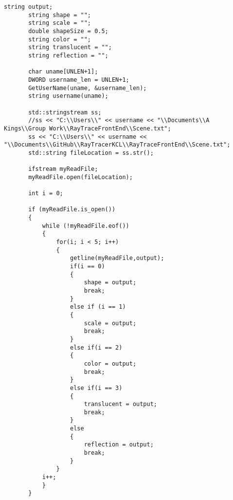 \documentclass{article}
\begin{document}
\begin{lstlisting}
string output;
       string shape = "";
       string scale = "";
       double shapeSize = 0.5;
       string color = "";
       string translucent = "";
       string reflection = "";

       char uname[UNLEN+1];
       DWORD username_len = UNLEN+1;
       GetUserName(uname, &username_len);
       string username(uname);

       std::stringstream ss;
       //ss << "C:\\Users\\" << username << "\\Documents\\A Kings\\Group Work\\RayTraceFrontEnd\\Scene.txt";
       ss << "C:\\Users\\" << username << "\\Documents\\GitHub\\RayTracerKCL\\RayTraceFrontEnd\\Scene.txt";
       std::string fileLocation = ss.str();

       ifstream myReadFile;
       myReadFile.open(fileLocation);

       int i = 0;

       if (myReadFile.is_open())
       {
           while (!myReadFile.eof())
           {
               for(i; i < 5; i++)
               {
                   getline(myReadFile,output);
                   if(i == 0)
                   {
                       shape = output;
                       break;
                   }
                   else if (i == 1)
                   {
                       scale = output;
                       break;
                   }
                   else if(i == 2)
                   {
                       color = output;
                       break;
                   }
                   else if(i == 3)
                   {
                       translucent = output;
                       break;
                   }
                   else
                   {
                       reflection = output;
                       break;
                   }
               }
           i++;
           }
       }



\end{lstlisting}
\end{document}
